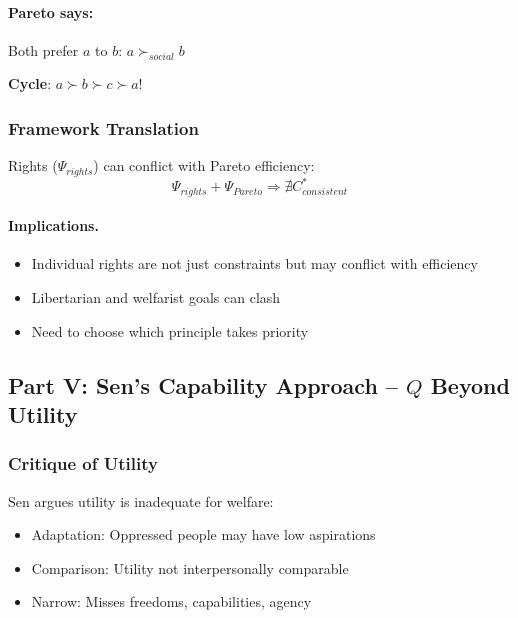 \paragraph{Pareto says:}
Both prefer $a$ to $b$: $a \succ_{social} b$

\textbf{Cycle}: $a \succ b \succ c \succ a$!

\subsubsection{Framework Translation}

Rights ($\Psi_{rights}$) can conflict with Pareto efficiency:
\begin{equation}
\Psi_{rights} + \Psi_{Pareto} \Rightarrow \nexists C^*_{consistent}
\end{equation}

\paragraph{Implications.}
\begin{itemize}
    \item Individual rights are not just constraints but may conflict with efficiency
    \item Libertarian and welfarist goals can clash
    \item Need to choose which principle takes priority
\end{itemize}

\subsection{Part V: Sen's Capability Approach – $Q$ Beyond Utility}

\subsubsection{Critique of Utility}

Sen argues utility is inadequate for welfare:
\begin{itemize}
    \item Adaptation: Oppressed people may have low aspirations
    \item Comparison: Utility not interpersonally comparable
    \item Narrow: Misses freedoms, capabilities, agency
\end{itemize}

